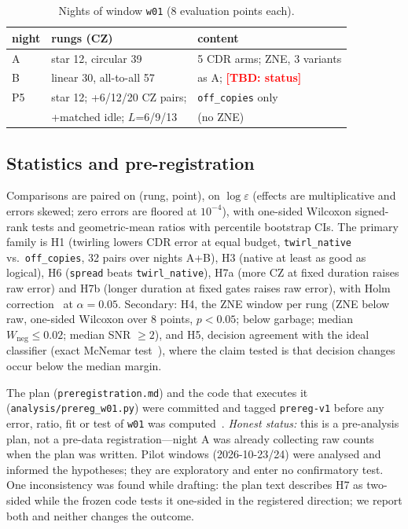 \documentclass[conference]{IEEEtran}
\newcommand{\TBD}[1]{\textcolor{red}{\textbf{[TBD: #1]}}}
\newcommand{\arm}[1]{\texttt{#1}}
\begin{document}
\begin{table}[t]
\caption{Nights of window \texttt{w01} (8 evaluation points each).}
\label{tab:nights}
\centering\footnotesize
\begin{tabular}{@{}lll@{}}
\toprule
night & rungs (CZ) & content \\[-1pt]
\midrule
A  & star 12, circular 39 & 5 CDR arms; ZNE, 3 variants \\
B  & linear 30, all-to-all 57 & as A; \TBD{status} \\
P5 & star 12; +6/12/20 CZ pairs; & \arm{off\_copies} only \\
   & +matched idle; $L$=6/9/13 & (no ZNE) \\
\bottomrule
\end{tabular}
\end{table}

\subsection{Statistics and pre-registration}
Comparisons are paired on (rung, point), on $\log\varepsilon$ (effects are multiplicative and
errors skewed; zero errors are floored at $10^{-4}$), with one-sided Wilcoxon signed-rank tests
\cite{wilcoxon1945} and geometric-mean ratios with percentile bootstrap CIs. The primary family
is H1 (twirling lowers CDR error at equal budget, \arm{twirl\_native} vs.\ \arm{off\_copies},
32 pairs over nights A+B), H3 (native at least as good as logical), H6 (\arm{spread} beats
\arm{twirl\_native}), H7a (more CZ at fixed duration raises raw error) and H7b (longer duration
at fixed gates raises raw error), with Holm correction~\cite{holm1979} at $\alpha=0.05$.
Secondary: H4, the ZNE window per rung (ZNE below raw, one-sided Wilcoxon over 8 points,
$p<0.05$; below garbage; median $W_{\text{neg}}\le0.02$; median SNR $\ge2$), and H5, decision
agreement with the ideal classifier (exact McNemar test~\cite{mcnemar1947}), where the claim
tested is that decision changes occur below the median margin.

The plan (\texttt{preregistration.md}) and the code that executes it
(\texttt{analysis/prereg\_w01.py}) were committed and tagged \texttt{prereg-v1} before any error,
ratio, fit or test of \texttt{w01} was computed~\cite{nosek2018}. \emph{Honest status:} this is a
pre-analysis plan, not a pre-data registration---night A was already collecting raw counts when
the plan was written. Pilot windows (2026-10-23/24) were analysed and informed the hypotheses;
they are exploratory and enter no confirmatory test. One inconsistency was found while
drafting: the plan text describes H7 as two-sided while the frozen code tests it one-sided in
the registered direction; we report both and neither changes the outcome.
\end{document}
